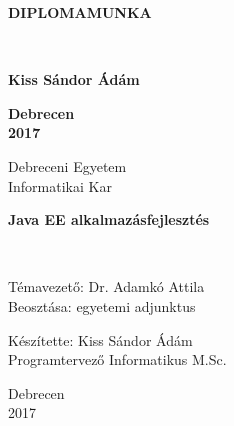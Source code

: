 \documentclass[hidelinks, 12pt, a4paper]{report}
\begin{document}
\begin{titlepage}
\pagestyle{empty}

\vspace*{4cm}

\begin{center}
\vfill
\begin{minipage}{\linewidth}
\centering
\begin{spacing}{2.5}
{ \huge \bfseries DIPLOMAMUNKA }
\end{spacing}
\end{minipage}
\\[10cm]

\begin{minipage}{1.0\textwidth}
\begin{flushright} \Large \bfseries
Kiss Sándor Ádám
\end{flushright}
\end{minipage}

\vfill

{\Large \bfseries Debrecen \\ 2017}

\end{center}
\end{titlepage}

\begin{titlepage}
\pagestyle{empty}
\begin{center}
Debreceni Egyetem \\
Informatikai Kar
\end{center}

\begin{center}
\vfill
\begin{minipage}{\linewidth}
\centering
\begin{spacing}{2.5}
{ \huge \bfseries Java EE alkalmazásfejlesztés }
\end{spacing}
\end{minipage}
\\[7cm]
\begin{minipage}{0.45\textwidth}
\begin{flushleft} \large
Témavezető: Dr. Adamkó Attila\\
Beosztása: egyetemi adjunktus
\end{flushleft}
\end{minipage}
\begin{minipage}{0.5\textwidth}
\begin{flushright} \large
Készítette: Kiss Sándor Ádám\\
Programtervező Informatikus M.Sc.
\end{flushright}
\end{minipage}

\vfill

{\large Debrecen \\ 2017}

\end{center}
\end{titlepage}
\end{document}
